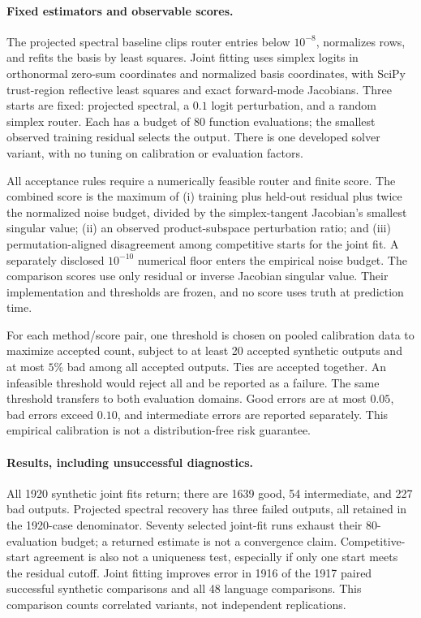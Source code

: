 \paragraph{Fixed estimators and observable scores.}
The projected spectral baseline clips router entries below $10^{-8}$,
normalizes rows, and refits the basis by least squares. Joint fitting uses
simplex logits in orthonormal zero-sum coordinates and normalized basis
coordinates, with SciPy trust-region reflective least squares and exact
forward-mode Jacobians. Three starts are fixed: projected spectral,
a $0.1$ logit perturbation, and a random simplex router. Each has a budget
of 80 function evaluations; the smallest observed training residual selects
the output. There is one developed solver variant, with no tuning on
calibration or evaluation factors.

All acceptance rules require a numerically feasible router and finite score.
The combined score is the maximum of (i) training plus held-out residual
plus twice the normalized noise budget, divided by the simplex-tangent
Jacobian's smallest singular value; (ii) an observed product-subspace
perturbation ratio; and (iii) permutation-aligned disagreement among
competitive starts for the joint fit. A separately disclosed $10^{-10}$
numerical floor enters the empirical noise budget.
The comparison scores use only residual or inverse Jacobian singular value.
Their implementation and thresholds are frozen, and no score uses truth
at prediction time.

For each method/score pair, one threshold is chosen on pooled calibration
data to maximize accepted count, subject to at least 20 accepted synthetic
outputs and at most $5\%$ bad among all accepted outputs. Ties are accepted
together. An infeasible threshold would reject all and be reported as a
failure. The same threshold transfers to both evaluation domains.
Good errors are at most $0.05$, bad errors exceed $0.10$, and intermediate
errors are reported separately. This empirical calibration is not a
distribution-free risk guarantee.



\paragraph{Results, including unsuccessful diagnostics.}
All 1920 synthetic joint fits return; there are 1639 good, 54 intermediate,
and 227 bad outputs. Projected spectral recovery has three failed outputs,
all retained in the 1920-case denominator.
Seventy selected joint-fit runs exhaust their 80-evaluation budget; a returned
estimate is not a convergence claim. Competitive-start agreement is also
not a uniqueness test, especially if only one start meets the residual cutoff.
Joint fitting improves error in 1916 of the 1917 paired successful
synthetic comparisons and all 48 language comparisons.
This comparison counts correlated variants, not independent replications.

